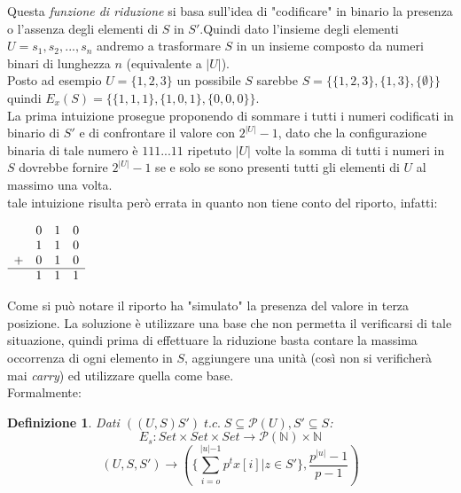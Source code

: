 \documentclass[a4paper]{article}
\newtheorem*{definition}{Definizione}
\begin{document}
Questa \textit{funzione di riduzione} si basa sull'idea di "codificare" in binario la presenza o l'assenza degli elementi di $S$ in $S'$.Quindi dato l'insieme degli elementi $U={s_1, s_2,...,s_n}$ andremo a trasformare $S$ in un insieme composto da numeri binari di lunghezza $n$ (equivalente a $|U|$).\\
Posto ad esempio $U = \{1,2,3\}$ un possibile $S$ sarebbe $S= \{\{1,2,3\},\{1,3\},\{\emptyset\}\}$ quindi $E_x(S) = \{\{1,1,1\},\{1,0,1\},\{0,0,0\}\}$.\\
La prima intuizione prosegue proponendo di sommare i tutti i numeri codificati in binario di $S'$ e di confrontare il valore con $2^{|U|}-1$, dato che la configurazione binaria di tale numero è $111...11$ ripetuto $|U|$ volte la somma di tutti i numeri in $S$ dovrebbe fornire $2^{|U|}-1$ se e solo se sono presenti tutti gli elementi di $U$ al massimo una volta.\\
tale intuizione risulta però errata in quanto non tiene conto del riporto, infatti:
\begin{center}$\begin{array}{llll}
  & 0 & 1  & 0  \\ %
  & 1 & 1  & 0  \\	%
+ &  0 & 1  & 0  \\ %
\hline
  &  1 & 1  & 1  \\ %
\end{array}$
\end{center}
Come si può notare il riporto ha "simulato" la presenza del valore in terza posizione.
La soluzione è utilizzare una base che non permetta il verificarsi di tale situazione, quindi prima di effettuare la riduzione basta contare la massima occorrenza di ogni elemento in $S$, aggiungere una unità (così non si verificherà mai \textit{carry}) ed utilizzare quella come base.
\\Formalmente:
\begin{definition}
	Dati $((U,S)S') \; t.c. \; S \subseteq \mathcal{P}(U), S' \subseteq S$:
	$$ E_s: Set \times Set \times Set \rightarrow \mathcal{P}(\mathbb{N}) \times \mathbb{N}$$
	$$(U,S,S') \rightarrow (\{\sum_{i=o}^{\rvert u \lvert -1} p^tx[i] | z \in S'\}, \frac{p^{\rvert u \lvert} -1}{p -1})$$
\end{definition}
\end{document}
